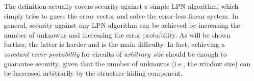 \begin{remark}
The definition actually covers security against a simple LPN algorithm, which simply tries to guess the error vector and solve the error-less linear system. In general, security against any LPN algorithm can be achieved by increasing the number of unknowns and increasing the error probability. As will be shown further, the latter is harder and is the main difficulty. In fact, achieving a \emph{constant error probability} for circuits of \emph{arbitrary size} should be enough to guarantee security, given that the number of unknowns (i.e., the window size) can be increased arbitrarily by the structure hiding component.
\end{remark}
